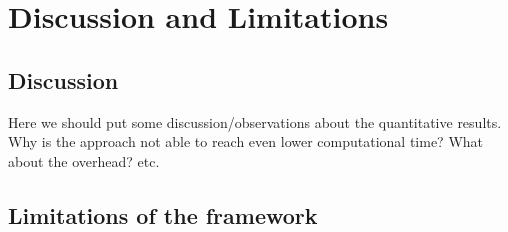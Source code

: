 
\section{Discussion and Limitations}
\label{sec:discussion}

\subsection{Discussion}
\label{sec:observations}
Here we should put some discussion/observations about the quantitative results. Why is the approach not able to reach even lower computational time? What about the overhead? etc. 

\subsection{Limitations of the framework}
\label{sec:limitations}
